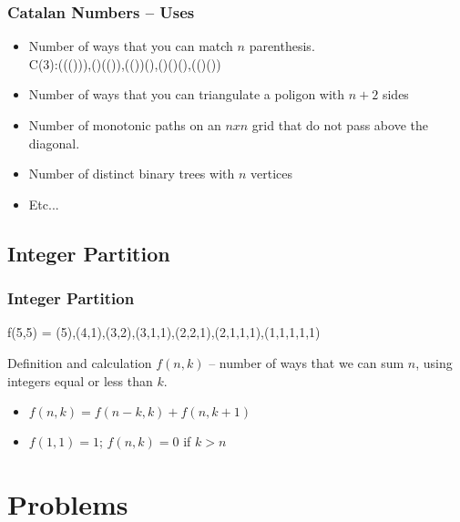 \documentclass{beamer}
\begin{document}
\begin{frame}
  \frametitle{Catalan Numbers -- Uses}
  \begin{itemize}
    \item Number of ways that you can match $n$ parenthesis.\\
      C(3):((())),()(()),(())(),()()(),(()())

      \medskip
      
    \item Number of ways that you can triangulate a poligon with $n+2$ sides
    \item Number of monotonic paths on an $nxn$ grid that do not pass above
      the diagonal.
    \item Number of distinct binary trees with $n$ vertices
    \item Etc...
  \end{itemize}
\end{frame}

\subsection{Integer Partition}
\begin{frame}
  \frametitle{Integer Partition}
  \begin{block}{}
    f(5,5) = (5),(4,1),(3,2),(3,1,1),(2,2,1),(2,1,1,1),(1,1,1,1,1)
  \end{block}
  \begin{block}{Definition and calculation}
    $f(n,k)$ -- number of ways that we can sum $n$, using integers
    equal or less than $k$.

    \bigskip

    \begin{itemize}
    \item $f(n,k) = f(n-k,k) + f(n, k+1)$
    \item $f(1,1) = 1$; $f(n,k) = 0$ if $k > n$ 
    \end{itemize}
  \end{block}
\end{frame}




\section{Problems}
\end{document}
